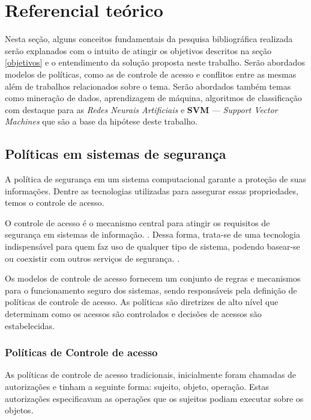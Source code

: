 \chapter{Referencial teórico}\label{referencial_teorico}
Nesta seção, alguns conceitos fundamentais da pesquisa bibliográfica realizada serão explanados com o intuito de atingir os objetivos descritos na seção \ref{objetivos} e o entendimento da solução proposta neste trabalho. Serão abordados modelos de políticas, como as de controle de acesso e conflitos entre as mesmas além de trabalhos relacionados sobre o tema. Serão abordados também temas como mineração de dados, aprendizagem de máquina, algoritmos de classificação com destaque para as \textit{Redes Neurais Artificiais} e \textbf{SVM} --- \textit{Support Vector Machines} que são a base da hipótese deste trabalho.


\section{Políticas em sistemas de segurança} \label{controle_acesso}
A política de segurança em um sistema computacional garante a proteção de suas informações. Dentre as tecnologias utilizadas para assegurar essas propriedades, temos o controle de acesso. \cite{sarkis:artigo:2016}

O controle de acesso é o mecanismo central para atingir os requisitos de segurança em  sistemas  de  informação. \cite{wang_conflicts_2010}. Dessa forma,  trata-se  de  uma  tecnologia indispensável para quem faz uso de qualquer tipo de sistema, podendo basear-se ou coexistir com outros serviços de segurança. \cite{sandhu:1996}.

Os modelos de controle de acesso fornecem um conjunto de regras e mecanismos para o funcionamento seguro dos sistemas, sendo responsáveis pela definição de políticas de controle de acesso. As políticas são diretrizes de alto nível que determinam como os acessos são controlados e decisões de acessos são estabelecidas. \cite{di_vimercati_policies_2005} \cite{sarkis2017}	


\subsection{Políticas de Controle de acesso}
As políticas de controle de acesso tradicionais, inicialmente foram chamadas de autorizações e tinham a seguinte forma: {sujeito, objeto, operação}. Estas autorizações especificavam as operações que os sujeitos podiam executar sobre os objetos. \cite{di_vimercati_policies_2005}\cite{sarkis2017}

